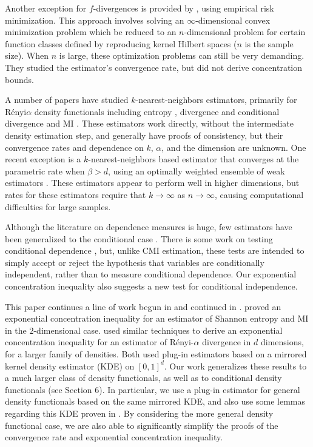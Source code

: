 \documentclass{article} %
\begin{document}
Another exception for $f$-divergences is provided by
\citep{nguyen10estimating}, using empirical risk minimization. This approach involves
solving an $\infty$-dimensional convex minimization problem which be reduced to
an $n$-dimensional problem for certain function classes defined by reproducing
kernel Hilbert spaces ($n$ is the sample size). When $n$ is large, these
optimization problems can still be very demanding. They studied the estimator's
convergence rate, but did not derive concentration bounds.

A number of papers have studied $k$-nearest-neighbors estimators, primarily for
R\'enyi$\alpha$ density functionals including entropy \citep{leonenko08tatra},
divergence \citep{Wang-Kulkarni-Verdu2009} and conditional divergence and MI
\citep{poczos12AISTATS}. These estimators work directly, without the
intermediate density estimation step, and generally have proofs of consistency,
but their convergence rates and dependence on $k$, $\alpha$, and the dimension
are unknown. One recent exception is a $k$-nearest-neighbors
based estimator that converges at the parametric rate when $\beta > d$, using
an optimally weighted ensemble of weak estimators
\citep{sricharan13ensemble, moon14ensemble}. These estimators appear to perform
well in higher dimensions, but rates for these estimators require that
$k \to \infty$ as $n \to \infty$, causing computational difficulties for large
samples.

Although the literature on dependence measures is huge, few estimators have
been generalized to the conditional case
\citep{fukumizu08kernelmeasures,reddi13dependence}. There is some work on
testing conditional dependence
\citep{su08dependencetest,bouezmarni09dependencetest}, but, unlike CMI
estimation, these tests are intended to simply accept or reject the hypothesis
that variables are conditionally independent, rather than to measure
conditional dependence. Our exponential concentration inequality also suggests
a new test for conditional independence.

This paper continues a line of work begun in \citep{liu12exponential} and
continued in \citep{singh14exponential}.
\citep{liu12exponential} proved an exponential concentration inequality for an
estimator of Shannon entropy and MI in the $2$-dimensional case.
\citep{singh14exponential} used similar techniques to derive an exponential
concentration inequality for an estimator of R\'enyi-$\alpha$ divergence in
$d$ dimensions, for a larger family of densities. Both used plug-in estimators
based on a mirrored kernel density estimator (KDE) on $[0,1]^d$. Our work
generalizes these results to a much larger class of density functionals, as
well as to conditional density functionals
(see Section 6). In particular, we use a plug-in estimator for general density
functionals based on the same mirrored KDE, and also use some lemmas regarding
this KDE proven in \citep{singh14exponential}. By considering the more general
density functional case, we are also able to significantly simplify the proofs
of the convergence rate and exponential concentration inequality.
\end{document}
